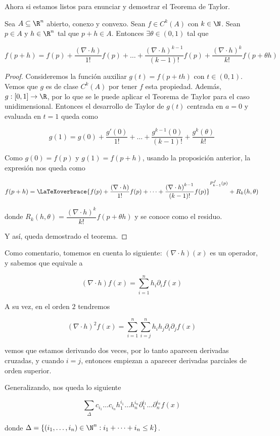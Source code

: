 Ahora si estamos listos para enunciar y demostrar el Teorema de Taylor.

\begin{teo}\label{teo:taylor}
    Sea $A \subseteq \R^n$ abierto, conexo y convexo. Sean $f \in C^k(A)$ con $k \in \N$. Sean $p \in A$ y $h \in \R^n$ tal que $p+h \in A$. Entonces $\exists
    \theta \in (0,1)$ tal que
    
    \[
    f(p+h) = f(p) + \dfrac{\left( \nabla \cdot h \right)}{1!}f(p) + \dots + \dfrac{\left( \nabla \cdot h \right)^{k-1}}{(k-1)!}f(p) + \dfrac{\left( \nabla \cdot h \right)^k}{k!}f(p+\theta h)
    \]
\end{teo}

\begin{proof}
    Consideremos la función auxiliar $g(t) = f(p + th)$ con $t \in (0,1)$. Vemos que $g$ es de clase $C^k(A)$ por tener $f$ esta propiedad. Además, $g: [0,1] \rightarrow \R$, por lo que se le puede aplicar el Teorema de Taylor para el caso unidimensional. Entonces el desarrollo de Taylor de $g(t)$ centrada en $a= 0$ y evaluada en $t=1$ queda como
    
    \[
    g(1) = g(0) + \dfrac{g'(0)}{1!} + \dots + \dfrac{g^{k-1}(0)}{(k-1)!} + \dfrac{g^k(\theta)}{k!}
    \]
    
    Como $g(0) = f(p)$ y $g(1) = f(p+h)$, usando la proposición anterior, la expresión nos queda como
    
    \[
    f(p+h) = \LaTeXoverbrace{f(p) + \dfrac{\left( \nabla \cdot h \right)}{1!}f(p) + \dots + \dfrac{\left( \nabla \cdot h \right)^{k-1}}{(k-1)!}f(p)}^{P_{k-1}^f(p)} + R_k(h, \theta)
    \]
    
    \noindent donde $R_k(h, \theta) = \dfrac{\left( \nabla \cdot h \right)^k}{k!}f(p+\theta h)$ y se conoce como el residuo.
    
    Y así, queda demostrado el teorema.
\end{proof}

\begin{aco}
    Como comentario, tomemos en cuenta lo siguiente: $(\nabla \cdot h)(x)$ es un operador, y sabemos que equivale a

    \[
    (\nabla \cdot h) f(x) = \sum_{i=1}^n h_i \partial_i f(x)
    \]
    
    A su vez, en el orden $2$ tendremos
    
    \[
    (\nabla \cdot h)^2 f(x) = \sum_{i=1}^n\sum_{i=j}^n h_ih_j \partial_i\partial_j f(x)
    \]
    
    \noindent vemos que estamos derivando dos veces, por lo tanto aparecen derivadas cruzadas, y cuando $i = j$, entonces empiezan a aparecer derivadas parciales de orden superior.
    
    Generalizando, nos queda lo siguiente
    
    \[
    \sum_{\Delta} c_{i_1} \dots c_{i_n} h_1^{i_1} \dots h_n^{i_n} \partial_1^{i_1} \dots \partial_n^{i_n} f(x)
    \]
    
    \noindent donde $\Delta = \{(i_1, \dots, i_n) \in \N^n : i_1 + \dots + i_n \leq k \}$.
\end{aco}

